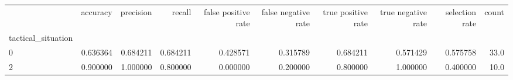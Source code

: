 \begin{tabular}{lrrrrrrrrr}
\toprule
{} &  accuracy &  precision &    recall &  false positive rate &  false negative rate &  true positive rate &  true negative rate &  selection rate &  count \\
tactical\_situation &           &            &           &                      &                      &                     &                     &                 &        \\
\midrule
0                  &  0.636364 &   0.684211 &  0.684211 &             0.428571 &             0.315789 &            0.684211 &            0.571429 &        0.575758 &   33.0 \\
2                  &  0.900000 &   1.000000 &  0.800000 &             0.000000 &             0.200000 &            0.800000 &            1.000000 &        0.400000 &   10.0 \\
\bottomrule
\end{tabular}
